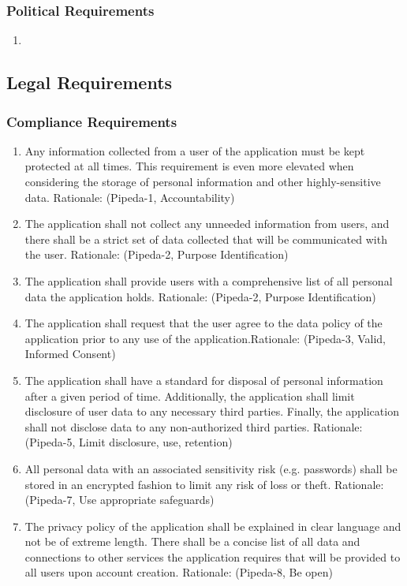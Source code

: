 \documentclass[]{article}
\begin{document}
\begin{enumerate}
\subsubsection{Political Requirements}
\label{ssub:political_requirements}
\begin{enumerate}[{CP-P}1. ]
	\item 
\end{enumerate}


\subsection{Legal Requirements}
\label{sub:legal_requirements}

\subsubsection{Compliance Requirements}
\label{ssub:compliance_requirements}
\begin{enumerate}[{LR-COMP}1. ]
	\item Any information collected from a user of the application must be kept protected at all times. This requirement is even more elevated when considering the storage of personal information and other highly-sensitive data. Rationale: (Pipeda-1, Accountability)
	\item The application shall not collect any unneeded information from users, and there shall be a strict set of data collected that will be communicated with the user. Rationale: (Pipeda-2, Purpose Identification)
	\item The application shall provide users with a comprehensive list of all personal data the application holds. Rationale: (Pipeda-2, Purpose Identification)
	\item The application shall request that the user agree to the data policy of the application prior to any use of the application.Rationale: (Pipeda-3, Valid, Informed Consent)
	\item The application shall have a standard for disposal of personal information after a given period of time. Additionally, the application shall limit disclosure of user data to any necessary third parties. Finally, the application shall not disclose data to any non-authorized third parties. Rationale: (Pipeda-5, Limit disclosure, use, retention)
	\item All personal data with an associated sensitivity risk (e.g. passwords) shall be stored in an encrypted fashion to limit any risk of loss or theft. Rationale: (Pipeda-7, Use appropriate safeguards)
	\item  The privacy policy of the application shall be explained in clear language and not be of extreme length. There shall be a concise list of all data and connections to other services the application requires that will be provided to all users upon account creation. Rationale: (Pipeda-8, Be open)
\end{enumerate}


\end{enumerate}
\end{document}
